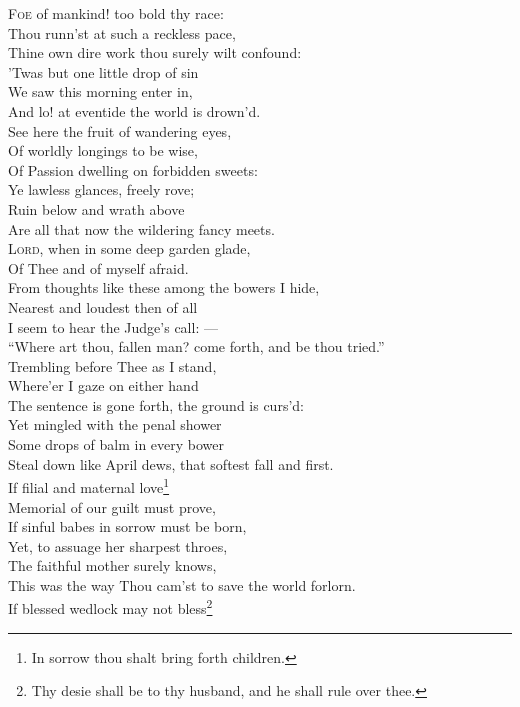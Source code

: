\textsc{Foe} of mankind! too bold thy race: \\
 Thou runn’st at such a reckless pace, \\
 Thine own dire work thou surely wilt confound: \\
 ’Twas but one little drop of sin \\
 We saw this morning enter in, \\
 And lo! at eventide the world is drown’d. \\
  See here the fruit of wandering eyes, \\
 Of worldly longings to be wise, \\
 Of Passion dwelling on forbidden sweets: \\
 Ye lawless glances, freely rove; \\
 Ruin below and wrath above \\
 Are all that now the wildering fancy meets. \\
  \textsc{Lord}, when in some deep garden glade, \\
 Of Thee and of myself afraid. \\
 From thoughts like these among the bowers I hide, \\
 Nearest and loudest then of all \\
 I seem to hear the Judge’s call: — \\
 “Where art thou, fallen man? come forth, and be thou tried.” \\
  Trembling before Thee as I stand, \\
 Where’er I gaze on either hand \\
 The sentence is gone forth, the ground is curs’d: \\
 Yet mingled with the penal shower \\
 Some drops of balm in every bower \\
 Steal down like April dews, that softest fall and first. \\
  If filial and maternal love\footnote{In sorrow thou shalt bring forth children.} \\
 Memorial of our guilt must prove, \\
 If sinful babes in sorrow must be born, \\
 Yet, to assuage her sharpest throes, \\
 The faithful mother surely knows, \\
 This was the way Thou cam’st to save the world forlorn. \\
  If blessed wedlock may not bless\footnote{Thy desie shall be to thy husband, and he shall rule over thee.} \\
